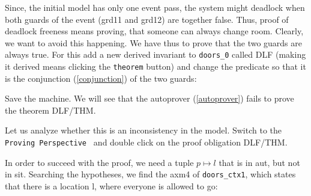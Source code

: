Since, the initial model has only one event \textsf{pass}, the system might deadlock when both guards of the event (\textsf{grd11} and \textsf{grd12}) are together false. Thus, proof of deadlock freeness means proving, that someone can always change room. Clearly, we want to avoid this happening. We have thus to prove that the two guards are always true. For this add a new derived invariant to \texttt{doors\_0} called \textsf{DLF} (making it derived means clicking the \texttt{theorem} button) and change the predicate so that it is the conjunction (\ref{conjunction}) of the two guards:

\begin{description}
\INVARIANTS
	\begin{description}
	\end{description}
\end{description}


Save the machine. We will see that the autoprover (\ref{autoprover}) fails to prove the theorem \textsf{DLF/THM}.


Let us analyze whether this is an inconsistency in the model. Switch to the \texttt{Proving Perspective } and double click on the proof obligation \textsf{DLF/THM}.



In order to succeed with the proof, we need a tuple $p \mapsto l$ that is in \textsf{aut}, but not in \textsf{sit}. Searching the hypotheses, we find the \textsf{axm4} of \texttt{doors\_ctx1}, which states that there is a location \textsf{l}, where everyone is allowed to go:

\begin{description}
\AXIOMS
	\begin{description}
		\nItemX{ axm4 }{ \exists l\qdot l\in L\setminus \{ outside\}  \land  P\cprod \{ l\} \subseteq aut }
	\end{description}
\end{description}

